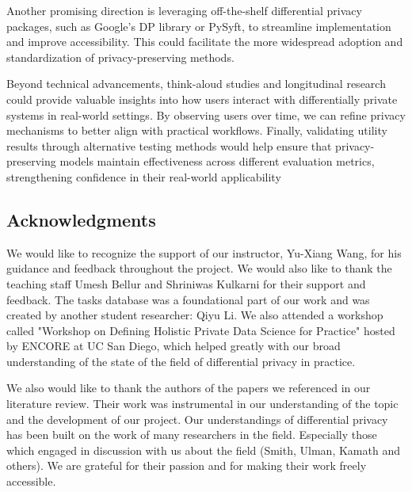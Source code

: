 \documentclass[12pt,letterpaper]{article}
\begin{document}
Another promising direction is leveraging off-the-shelf differential privacy packages, such as Google's DP library or PySyft, to streamline implementation and improve accessibility. This could facilitate the more widespread adoption and standardization of privacy-preserving methods.

Beyond technical advancements, think-aloud studies and longitudinal research could provide valuable insights into how users interact with differentially private systems in real-world settings. By observing users over time, we can refine privacy mechanisms to better align with practical workflows. Finally, validating utility results through alternative testing methods would help ensure that privacy-preserving models maintain effectiveness across different evaluation metrics, strengthening confidence in their real-world applicability


\subsection{Acknowledgments}

We would like to recognize the support of our instructor, Yu-Xiang Wang, for his guidance and feedback throughout the project. We would also like to thank the teaching staff Umesh Bellur and Shriniwas Kulkarni for their support and feedback. The tasks database was a foundational part of our work and was created by another student researcher: Qiyu Li. We also attended a workshop called "Workshop on Defining Holistic Private Data Science for Practice" hosted by ENCORE at UC San Diego, which helped greatly with our broad understanding of the state of the field of differential privacy in practice.

We also would like to thank the authors of the papers we referenced in our literature review. Their work was instrumental in our understanding of the topic and the development of our project. Our understandings of differential privacy has been built on the work of many researchers in the field. Especially those which engaged in discussion with us about the field (Smith, Ulman, Kamath and others). We are grateful for their passion and for making their work freely accessible.

%

\makereference


\end{document}
